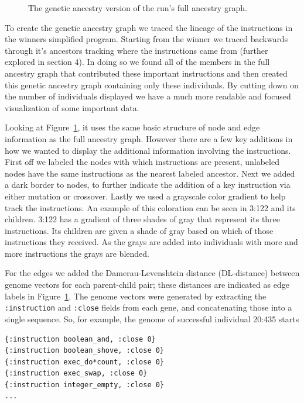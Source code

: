 \begin{figure}[tb!p]
\begin{center}
	\end{center}
	\caption{The genetic ancestry version of the run's full ancestry graph.}
	\label{fig:run0Filtered}       %
\end{figure}

To create the genetic ancestry graph we traced the lineage of the instructions in the winners
simplified program. Starting from the winner we traced backwards through it's ancestors tracking where
the instructions came from (further explored in section 4). In doing so we found all of the members
in the full ancestry graph that contributed these important instructions and then created this genetic
ancestry graph containing only these individuals. By cutting down on the number of individuals displayed
we have a much more readable and focused visualization of some important data.

Looking at Figure~\ref{fig:run0Filtered}, it uses the same basic structure of node and edge information
as the full ancestry graph.
However there are a few key additions in how we wanted to display the additional information involving
the instructions. First off we labeled the nodes with which instructions are present, unlabeled nodes
have the same instructions as the nearest labeled ancestor. Next we added a dark border to 
nodes, to further indicate the addition of a key instruction via either mutation or crossover. Lastly
we used a grayscale color gradient to help track the instructions. An example of this coloration can be seen
in 3:122 and its children. 3:122 has a gradient of three shades of gray that represent its three instructions.
Its children are given a shade of gray based on which of those instructions they received. As the grays
are added into individuals with more and more instructions the grays are blended.

For the edges we added the Damerau-Levenshtein distance (DL-distance)
between genome vectors for each parent-child pair; these distances
are indicated as edge labels in Figure~\ref{fig:run0Filtered}. The genome
vectors were generated by extracting the \texttt{:instruction} and 
\texttt{:close} fields from each gene, and concatenating those into a
single sequence. So, for example, the genome of successful individual
20:435 starts

\begin{verbatim}
{:instruction boolean_and, :close 0} 
{:instruction boolean_shove, :close 0} 
{:instruction exec_do*count, :close 0} 
{:instruction exec_swap, :close 0} 
{:instruction integer_empty, :close 0}
...
\end{verbatim}

